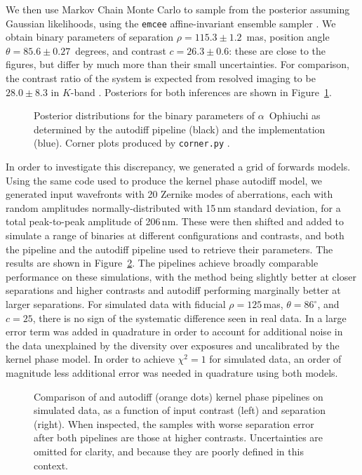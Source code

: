 \documentclass[modern]{aastex63}
\begin{document}
We then use Markov Chain Monte Carlo \citep{metropolis53} to sample from the posterior assuming Gaussian likelihoods, using the \texttt{emcee} affine-invariant ensemble sampler \citep{emcee}. We obtain binary parameters of separation $\rho = 115.3 \pm 1.2$~mas, position angle $\theta = 85.6 \pm 0.27$~degrees, and contrast $c = 26.3 \pm 0.6$: these are close to the \citet{martinache20} figures, but differ by much more than their small uncertainties. For comparison, the contrast ratio of the system is expected from resolved imaging to be $28.0 \pm 8.3$ in $K$-band \citep{hinkley11}. Posteriors for both inferences are shown in Figure~\ref{comparison_posterior}. 

\begin{figure}
\caption{Posterior distributions for the binary parameters of $\alpha$~Ophiuchi as determined by the autodiff pipeline (black) and the \citet{martinache20} implementation (blue). Corner plots produced by \texttt{corner.py} \citep{corner}. \label{comparison_posterior}}
\end{figure}

In order to investigate this discrepancy, we generated a grid of forwards models. Using the same code used to produce the kernel phase autodiff model, we generated input wavefronts with 20 Zernike modes of aberrations, each with random amplitudes normally-distributed with 15\,nm standard deviation, for a total peak-to-peak amplitude of 206\,nm. These were then shifted and added to simulate a range of binaries at different configurations and contrasts, and both the \citet{martinache20} pipeline and the autodiff pipeline used to retrieve their parameters. The results are shown in Figure~\ref{method_comparison_ensemble}. The pipelines achieve broadly comparable performance on these simulations, with the \citet{martinache20} method being slightly better at closer separations and higher contrasts and autodiff performing marginally better at larger separations. For simulated data with fiducial $\rho = 125$\,mas, $\theta=86^\circ$, and $c = 25$, there is no sign of the systematic difference seen in real data. In \citet{martinache20} a large error term was added in quadrature in order to account for additional noise in the data unexplained by the diversity over exposures and uncalibrated by the kernel phase model. In order to achieve $\chi^2 = 1$ for simulated data, an order of magnitude less additional error was needed in quadrature using both models.

\begin{figure}
\caption{Comparison of \citet[][blue stars]{martinache20} and autodiff (orange dots) kernel phase pipelines on simulated data, as a function of input contrast (left) and separation (right). When inspected, the samples with worse separation error after both pipelines are those at higher contrasts. Uncertainties are omitted for clarity, and because they are poorly defined in this context. \label{method_comparison_ensemble}}
\end{figure}
\end{document}
